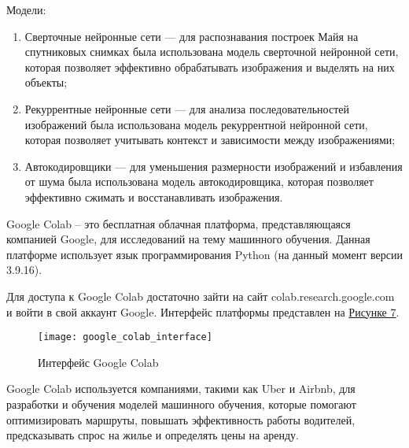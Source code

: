     Модели:
    \begin{enumerate}
        \item Сверточные нейронные сети — для распознавания построек Майя на спутниковых снимках была использована модель сверточной нейронной сети, которая позволяет эффективно обрабатывать изображения и выделять на них объекты;
        \item Рекуррентные нейронные сети — для анализа последовательностей изображений была использована модель рекуррентной нейронной сети, которая позволяет учитывать контекст и зависимости между изображениями;
        \item Автокодировщики — для уменьшения размерности изображений и избавления от шума была использована модель автокодировщика, которая позволяет эффективно сжимать и восстанавливать изображения.
    \end{enumerate}

    Google Colab – это бесплатная облачная платформа, представляющаяся компанией Google, для исследований на тему машинного обучения. Данная платформе использует язык программирования Python (на данный момент версии 3.9.16).

    Для доступа к Google Colab достаточно зайти на сайт colab.research.google.com и войти в свой аккаунт Google. Интерфейс платформы представлен на \hyperref[fig:google_colab_interface]{Рисунке 7}.

    \begin{figure}[ht]
        \centering
        \texttt{[image: google\_colab\_interface]}
        \caption{Интерфейс Google Colab}
        \label{fig:google_colab_interface}
    \end{figure}

    Google Colab используется компаниями, такими как Uber и Airbnb, для разработки и обучения моделей машинного обучения, которые помогают оптимизировать маршруты, повышать эффективность работы водителей, предсказывать спрос на жилье и определять цены на аренду.

